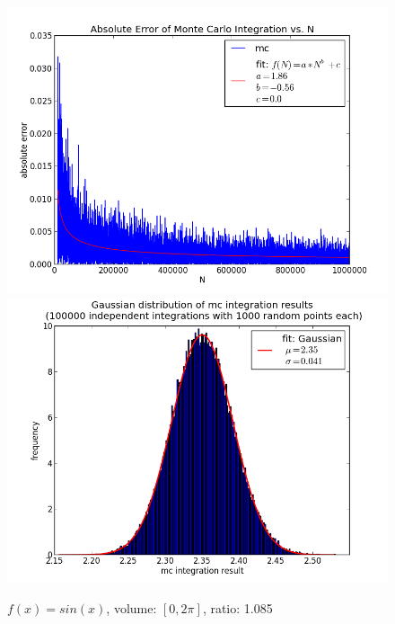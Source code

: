 \documentclass[12pt,a4paper,titlepage]{article}
\begin{document}
\begin{appendix}
\begin{figure}
\begin{minipage}[b]{\linewidth}
		\includegraphics[width=\linewidth]{Plots/eFunktion}
	\end{minipage}
	\begin{minipage}[b]{\linewidth}
		\centering
		\includegraphics[width=\linewidth]{Plots/eFunktionHist}
	\end{minipage}
	\label{fig:linear}
\end{figure}
\begin{figure}
	\centering
	\caption{$f(x)=sin(x)$, volume: $[0,2\pi]$, ratio: 1.085}
	\begin{minipage}[b]{\linewidth}
		\centering

\end{minipage}
\end{figure}
\end{appendix}
\end{document}
